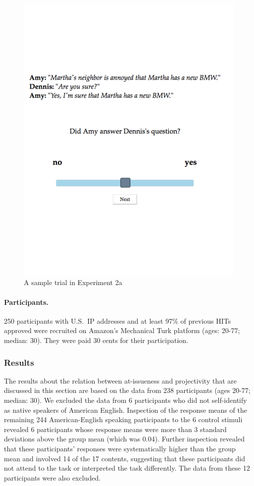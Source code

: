 \documentclass[11pt,fleqn]{article}
\newcommand{\6}{\mbox{$[\hspace*{-.6mm}[$}}
\newcommand{\9}{\mbox{$]\hspace*{-.6mm}]$}}
\begin{document}
\begin{figure}[!h]
\begin{center}
\includegraphics[width=12cm]{exp2-trial}
\end{center}
\caption{A sample trial in Experiment 2a}\label{f-trial-exp2a}
\end{figure}

\paragraph{Participants.} 250 participants with U.S.\ IP addresses and at least 97\% of previous HITs approved were recruited on Amazon's Mechanical Turk platform (ages: 20-77; median: 30). They were paid 30 cents for their participation.

\subsubsection{Results}

The results about the relation between at-issueness and projectivity that are discussed in this section are based on the data from 238 participants (ages 20-77; median: 30). We excluded the data from 6 participants who did not self-identify as native speakers of American English. Inspection of the response means of the remaining 244 American-English speaking participants to the 6 control stimuli revealed 6 participants whose response means were more than 3 standard deviations above the group mean (which was 0.04). Further inspection revealed that these participants' responses were systematically higher than the group mean and involved 14 of the 17 contents, suggesting that these participants did not attend to the task or interpreted the task differently. The data from these 12 participants were also excluded.
\end{document}
